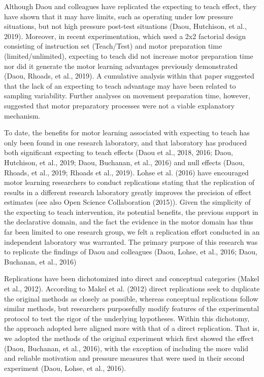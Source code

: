 \documentclass[
  english,
  man,floatsintext]{apa7}
\begin{document}
Although Daou and colleagues have replicated the expecting to teach effect, they have shown that it may have limits, such as operating under low pressure situations, but not high pressure post-test situations (Daou, Hutchison, et al., 2019). Moreover, in recent experimentation, which used a 2x2 factorial design consisting of instruction set (Teach/Test) and motor preparation time (limited/unlimited), expecting to teach did not increase motor preparation time nor did it generate the motor learning advantages previously demonstrated (Daou, Rhoads, et al., 2019). A cumulative analysis within that paper suggested that the lack of an expecting to teach advantage may have been related to sampling variability. Further analyses on movement preparation time, however, suggested that motor preparatory processes were not a viable explanatory mechanism.

To date, the benefits for motor learning associated with expecting to teach has only been found in one research laboratory, and that laboratory has produced both significant expecting to teach effects (Daou et al., 2018, 2016; Daou, Hutchison, et al., 2019; Daou, Buchanan, et al., 2016) and null effects (Daou, Rhoads, et al., 2019; Rhoads et al., 2019). Lohse et al. (2016) have encouraged motor learning researchers to conduct replications stating that the replication of results in a different research laboratory greatly improves the precision of effect estimates (see also Open Science Collaboration (2015)). Given the simplicity of the expecting to teach intervention, its potential benefits, the previous support in the declarative domain, and the fact the evidence in the motor domain has thus far been limited to one research group, we felt a replication effort conducted in an independent laboratory was warranted. The primary purpose of this research was to replicate the findings of Daou and colleagues (Daou, Lohse, et al., 2016; Daou, Buchanan, et al., 2016)

Replications have been dichotomized into direct and conceptual categories (Makel et al., 2012). According to Makel et al. (2012) direct replications seek to duplicate the original methods as closely as possible, whereas conceptual replications follow similar methods, but researchers purposefully modify features of the experimental protocol to test the rigor of the underlying hypotheses. Within this dichotomy, the approach adopted here aligned more with that of a direct replication. That is, we adopted the methods of the original experiment which first showed the effect (Daou, Buchanan, et al., 2016), with the exception of including the more valid and reliable motivation and pressure measures that were used in their second experiment (Daou, Lohse, et al., 2016).
\end{document}
